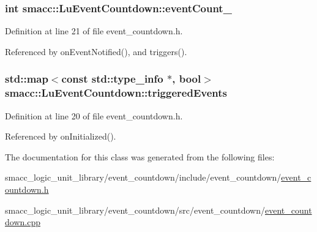 \subsubsection[{\texorpdfstring{event\+Count\+\_\+}{eventCount_}}]{\setlength{\rightskip}{0pt plus 5cm}int smacc\+::\+Lu\+Event\+Countdown\+::event\+Count\+\_\+\hspace{0.3cm}{\ttfamily [private]}}\hypertarget{classsmacc_1_1LuEventCountdown_a3ede7931d5c6fea0fd41c3aadea01599}{}\label{classsmacc_1_1LuEventCountdown_a3ede7931d5c6fea0fd41c3aadea01599}


Definition at line 21 of file event\+\_\+countdown.\+h.



Referenced by on\+Event\+Notified(), and triggers().

\subsubsection[{\texorpdfstring{triggered\+Events}{triggeredEvents}}]{\setlength{\rightskip}{0pt plus 5cm}std\+::map$<$const std\+::type\+\_\+info $\ast$, {\bf bool}$>$ smacc\+::\+Lu\+Event\+Countdown\+::triggered\+Events\hspace{0.3cm}{\ttfamily [private]}}\hypertarget{classsmacc_1_1LuEventCountdown_ac352e65ff261f866ac1cc65e6e811d55}{}\label{classsmacc_1_1LuEventCountdown_ac352e65ff261f866ac1cc65e6e811d55}


Definition at line 20 of file event\+\_\+countdown.\+h.



Referenced by on\+Initialized().



The documentation for this class was generated from the following files\+:\begin{DoxyCompactItemize}
\item 
smacc\+\_\+logic\+\_\+unit\+\_\+library/event\+\_\+countdown/include/event\+\_\+countdown/\hyperlink{event__countdown_8h}{event\+\_\+countdown.\+h}\item 
smacc\+\_\+logic\+\_\+unit\+\_\+library/event\+\_\+countdown/src/event\+\_\+countdown/\hyperlink{event__countdown_8cpp}{event\+\_\+countdown.\+cpp}\end{DoxyCompactItemize}
